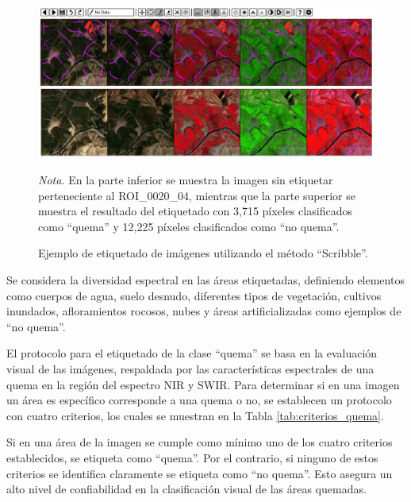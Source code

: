 \begin{figure}[H]
    \centering
    \caption{Ejemplo de etiquetado de imágenes utilizando el método ``Scribble''.}
    \includegraphics[width=1\textwidth]{img/6_metodologia/scribble.png}
    \label{fig:scribble}
    \begin{flushleft}
        \vspace{-\baselineskip}
        \textit{Nota.} En la parte inferior se muestra la imagen sin etiquetar perteneciente al ROI\_0020\_04, mientras que la parte superior se muestra el resultado del etiquetado con 
        3,715 píxeles clasificados como ``quema'' y 12,225 píxeles clasificados como ``no quema''.       
    \end{flushleft}
\end{figure}

Se considera la diversidad espectral en las áreas etiquetadas, definiendo elementos como cuerpos de agua, suelo desnudo, diferentes tipos de 
vegetación, cultivos inundados, afloramientos rocosos, nubes y áreas artificializadas como ejemplos de ``no quema''.

El protocolo para el etiquetado de la clase ``quema'' se basa en la evaluación visual de las imágenes, respaldada por las características espectrales de una quema en la región del espectro
NIR y SWIR. Para determinar si en una imagen un área es específico corresponde a una quema o no, se establecen un protocolo con cuatro criterios, los cuales se muestran en la Tabla \ref{tab:criterios_quema}. 

Si en una área de la imagen se cumple como mínimo uno de los cuatro criterios establecidos, se etiqueta como ``quema''. Por el contrario, si ninguno de estos criterios se identifica claramente se etiqueta 
como ``no quema''. Esto asegura un alto nivel de confiabilidad en la clasificación visual de las áreas quemadas.

